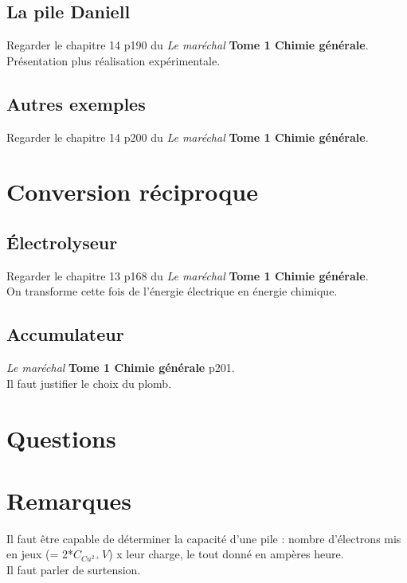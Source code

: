 \subsection{La pile Daniell}
Regarder le chapitre 14 p190 du \textit{Le maréchal} \textbf{Tome 1 Chimie générale}.\\
Présentation plus réalisation expérimentale.

\subsection{Autres exemples}
Regarder le chapitre 14 p200 du \textit{Le maréchal} \textbf{Tome 1 Chimie générale}.

\section{Conversion réciproque}
\subsection{Électrolyseur}
Regarder le chapitre 13 p168 du \textit{Le maréchal} \textbf{Tome 1 Chimie générale}.\\
On transforme cette fois de l'énergie électrique en énergie chimique.
\subsection{Accumulateur}
\textit{Le maréchal} \textbf{Tome 1 Chimie générale} p201.\\
Il faut justifier le choix du plomb.
	
\section*{Questions}



\section*{Remarques}
	
	Il faut être capable de déterminer la capacité d'une pile : nombre d'électrons mis en jeux (= 2*$C_{Cu^{2+}}V$) x leur charge, le tout donné en ampères heure.\\
	Il faut parler de surtension.
	
	
	
	

